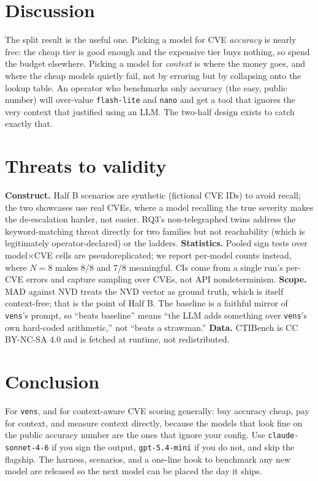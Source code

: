 \documentclass[10pt,twocolumn]{article}
\newcommand{\code}[1]{\texttt{\small #1}}
\begin{document}
\section{Discussion}
The split result is the useful one. Picking a model for CVE \emph{accuracy} is
nearly free: the cheap tier is good enough and the expensive tier buys nothing,
so spend the budget elsewhere. Picking a model for \emph{context} is where the
money goes, and where the cheap models quietly fail, not by erroring but by
collapsing onto the lookup table. An operator who benchmarks only accuracy (the
easy, public number) will over-value \code{flash-lite} and \code{nano} and get a
tool that ignores the very context that justified using an LLM. The two-half
design exists to catch exactly that.

\section{Threats to validity}
\textbf{Construct.} Half B scenarios are synthetic (fictional CVE IDs) to avoid
recall; the two showcases use real CVEs, where a model recalling the true
severity makes the de-escalation harder, not easier. RQ3's non-telegraphed twins
address the keyword-matching threat directly for two families but not
reachability (which is legitimately operator-declared) or the ladders.
\textbf{Statistics.} Pooled sign tests over model$\times$CVE cells are
pseudoreplicated; we report per-model counts instead, where $N{=}8$ makes 8/8 and
7/8 meaningful. CIs come from a single run's per-CVE errors and capture sampling
over CVEs, not API nondeterminism. \textbf{Scope.} MAD against NVD treats the NVD
vector as ground truth, which is itself context-free; that is the point of Half
B. The baseline is a faithful mirror of \code{vens}'s prompt, so ``beats
baseline'' means ``the LLM adds something over \code{vens}'s own hard-coded
arithmetic,'' not ``beats a strawman.'' \textbf{Data.} CTIBench is CC BY-NC-SA
4.0 and is fetched at runtime, not redistributed.

\section{Conclusion}
For \code{vens}, and for context-aware CVE scoring generally: buy accuracy cheap,
pay for context, and measure context directly, because the models that look
fine on the public accuracy number are the ones that ignore your config. Use
\code{claude-sonnet-4-6} if you sign the output, \code{gpt-5.4-mini} if you do
not, and skip the flagship. The harness, scenarios, and a one-line hook to
benchmark any new model are released so the next model can be placed the day it
ships.
\end{document}
